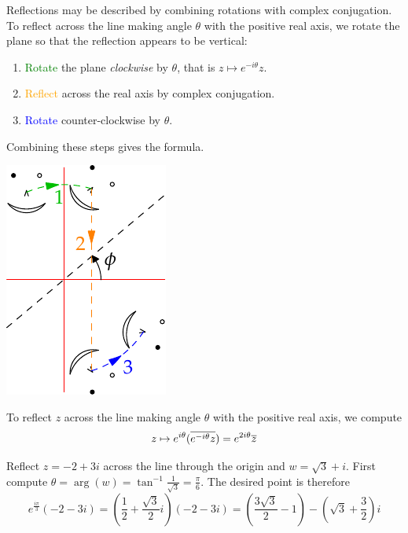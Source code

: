 \begin{minipage}[t]{0.73\linewidth}\vspace{0pt}
	Reflections may be described by combining rotations with complex conjugation. To reflect across the line making angle $\theta$ with the positive real axis, we rotate the plane so that the reflection appears to be vertical:
	\begin{enumerate}\itemsep0pt
	  \item \textcolor{Green}{Rotate} the plane \emph{clockwise} by $\theta$, that is $z\mapsto e^{-i\theta}z$.
	  \item \textcolor{orange}{Reflect} across the real axis by complex conjugation.
	  \item \textcolor{blue}{Rotate} counter-clockwise by $\theta$.
	\end{enumerate}
	Combining these steps gives the formula.
\end{minipage}
\hfill
\begin{minipage}[t]{0.26\linewidth}\vspace{-5pt}
		\flushright\includegraphics{complex-reflect}
\end{minipage}

\begin{thm}{}{}
	To reflect $z$ across the line making angle $\theta$ with the positive real axis, we compute
	\[
		z\mapsto e^{i\theta}(\overline{e^{-i\theta}z})=e^{2i\theta}\overline{z}
	\]
\end{thm}

\goodbreak

\begin{example}{}{}
	Reflect $z=-2+3i$ across the line through the origin and $w=\sqrt 3+i$.\smallbreak
	First compute $\theta=\arg(w)=\tan^{-1}\frac 1{\sqrt 3}=\frac\pi 6$. The desired point is therefore
	\[
		e^{\frac{i\pi}3}(-2-3i)=\left(\frac 12+\frac{\sqrt 3}2i\right)(-2-3i) =\left(\frac{3\sqrt 3}2-1\right)-\left(\sqrt 3+\frac 32\right)i
	\]
\end{example}

